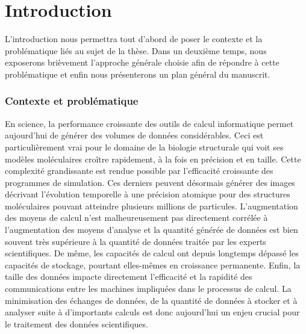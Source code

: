 
\chapter*{Introduction} %
\mtcaddchapter
{} %
\mtcaddpart
{}  %

L'introduction nous permettra tout d'abord de poser le contexte et la problématique liés au sujet de la thèse. Dans un deuxième temps, nous exposerons brièvement l'approche générale choisie afin de répondre à cette problématique et enfin nous présenterons un plan général du manuscrit.

\subsection*{Contexte et problématique}

En science, la performance croissante des outils de calcul informatique permet aujourd'hui de générer des volumes de données considérables. Ceci est particulièrement vrai pour le domaine de la biologie structurale qui voit ses modèles moléculaires croître rapidement, à la fois en précision et en taille. Cette complexité grandissante est rendue possible par l'efficacité croissante des programmes de simulation. Ces derniers peuvent désormais générer des images décrivant l'évolution temporelle à une précision atomique pour des structures moléculaires pouvant atteindre plusieurs millions de particules. L'augmentation des moyens de calcul n'est malheureusement pas directement corrélée à l'augmentation des moyens d'analyse et la quantité générée de données est bien souvent très supérieure à la quantité de données traitée par les experts scientifiques. De même, les capacités de calcul ont depuis longtemps dépassé les capacités de stockage, pourtant elles-mêmes en croissance permanente. Enfin, la taille des données impacte directement l'efficacité et la rapidité des communications entre les machines impliquées dans le processus de calcul. La minimisation des échanges de données, de la quantité de données à stocker et à analyser suite à d'importants calculs est donc aujourd'hui un enjeu crucial pour le traitement des données scientifiques.

